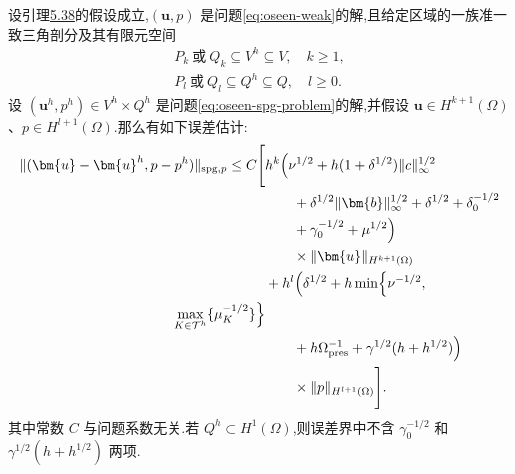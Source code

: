 \begin{theorem}[误差估计]\label{thm:oseen-spg-error-estimate}
设引理\hyperref[lem:oseen-spg-discrete-infsup]{5.38}的假设成立,$(\bm{u},p)$ 是问题\cref{eq:oseen-weak}的解,且给定区域的一族准一致三角剖分及其有限元空间
\[
 \begin{gathered}
 P_k\ \text{或}\ Q_k\subseteq V^h\subseteq V,\quad k\ge1,\\
 P_l\ \text{或}\ Q_l\subseteq Q^h\subseteq Q,\quad l\ge0.
 \end{gathered}
\]
设 $(\bm{u}^h,p^h)\in V^h\times Q^h$ 是问题\cref{eq:oseen-spg-problem}的解,并假设 $\bm{u}\in H^{k+1}(\Omega)$、$p\in H^{l+1}(\Omega)$.那么有如下误差估计:
\begin{equation}\label{eq:oseen-spg-error-estimate}
\begin{aligned}
 \|(\bm{u}-\bm{u}^h,p-p^h)\|_{\mathrm{spg},p}
 \le C\Biggl[&
 h^k\Bigl(\nu^{1/2}
       +h(1+\delta^{1/2})\|c\|_\infty^{1/2}\\
 &\qquad+\delta^{1/2}\|\bm{b}\|_\infty^{1/2}
       +\delta^{1/2}+\delta_0^{-1/2}\\
 &\qquad+\gamma_0^{-1/2}+\mu^{1/2}\Bigr)\\
 &\qquad\times\|\bm{u}\|_{H^{k+1}(\Omega)}\\
 &+h^l\Bigl(\delta^{1/2}
        +h\min\Bigl\{\nu^{-1/2},\\
               \max_{K\in\mathcal{T}^h}\{\mu_K^{-1/2}\}\Bigr\}\\
 &\qquad+h\Omega_{\mathrm{pres}}^{-1}
       +\gamma^{1/2}(h+h^{1/2})\Bigr)\\
 &\qquad\times\|p\|_{H^{l+1}(\Omega)}
 \Biggr].
\end{aligned}
\end{equation}
其中常数 $C$ 与问题系数无关.若 $Q^h\subset H^1(\Omega)$,则误差界中不含 $\gamma_0^{-1/2}$ 和 $\gamma^{1/2}(h+h^{1/2})$ 两项.
\end{theorem}
